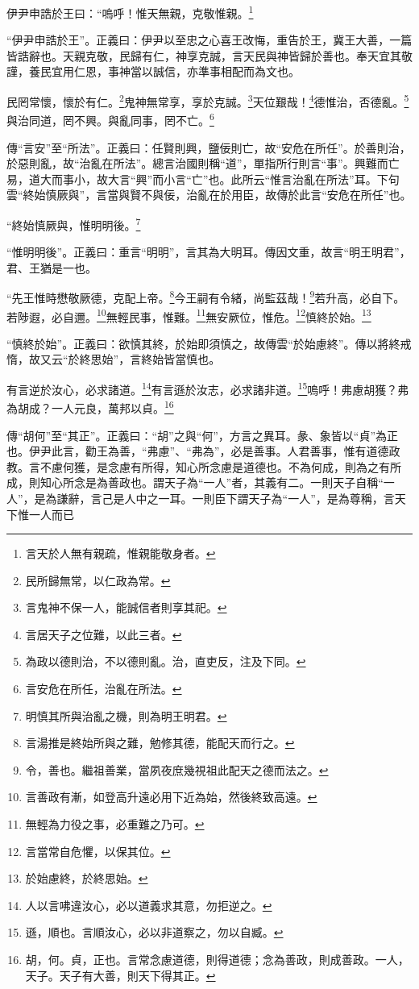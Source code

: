 伊尹申誥於王曰：“嗚呼！惟天無親，克敬惟親。\footnote{言天於人無有親疏，惟親能敬身者。}

{\noindent\shu{}\fzkt “伊尹申誥於王”。正義曰：伊尹以至忠之心喜王改悔，重告於王，冀王大善，一篇皆誥辭也。天親克敬，民歸有仁，神享克誠，言天民與神皆歸於善也。奉天宜其敬謹，養民宜用仁恩，事神當以誠信，亦準事相配而為文也。 \par}

民罔常懷，懷於有仁。\footnote{民所歸無常，以仁政為常。}鬼神無常享，享於克誠。\footnote{言鬼神不保一人，能誠信者則享其祀。}天位艱哉！\footnote{言居天子之位難，以此三者。}德惟治，否德亂。\footnote{為政以德則治，不以德則亂。治，直吏反，注及下同。}與治同道，罔不興。與亂同事，罔不亡。\footnote{言安危在所任，治亂在所法。}

{\noindent\zhuan{}\fzbyks 傳“言安”至“所法”。正義曰：任賢則興，鹽佞則亡，故“安危在所任”。於善則治，於惡則亂，故“治亂在所法”。總言治國則稱“道”，單指所行則言“事”。興難而亡易，道大而事小，故大言“興”而小言“亡”也。此所云“惟言治亂在所法”耳。下句雲“終始慎厥與”，言當與賢不與佞，治亂在於用臣，故傳於此言“安危在所任”也。 \par}

“終始慎厥與，惟明明後。\footnote{明慎其所與治亂之機，則為明王明君。}

{\noindent\shu{}\fzkt “惟明明後”。正義曰：重言“明明”，言其為大明耳。傳因文重，故言“明王明君”，君、王猶是一也。 \par}

“先王惟時懋敬厥德，克配上帝。\footnote{言湯推是終始所與之難，勉修其德，能配天而行之。}今王嗣有令緒，尚監茲哉！\footnote{令，善也。繼祖善業，當夙夜庶幾視祖此配天之德而法之。}若升高，必自下。若陟遐，必自邇。\footnote{言善政有漸，如登高升遠必用下近為始，然後終致高遠。}無輕民事，惟難。\footnote{無輕為力役之事，必重難之乃可。}無安厥位，惟危。\footnote{言當常自危懼，以保其位。}慎終於始。\footnote{於始慮終，於終思始。}

{\noindent\shu{}\fzkt “慎終於始”。正義曰：欲慎其終，於始即須慎之，故傳雲“於始慮終”。傳以將終戒惰，故又云“於終思始”，言終始皆當慎也。 \par}

有言逆於汝心，必求諸道。\footnote{人以言咈違汝心，必以道義求其意，勿拒逆之。}有言遜於汝志，必求諸非道。\footnote{遜，順也。言順汝心，必以非道察之，勿以自臧。}嗚呼！弗慮胡獲？弗為胡成？一人元良，萬邦以貞。\footnote{胡，何。貞，正也。言常念慮道德，則得道德；念為善政，則成善政。一人，天子。天子有大善，則天下得其正。}

{\noindent\zhuan{}\fzbyks 傳“胡何”至“其正”。正義曰：“胡”之與“何”，方言之異耳。彖、象皆以“貞”為正也。伊尹此言，勸王為善，“弗慮”、“弗為”，必是善事。人君善事，惟有道德政教。言不慮何獲，是念慮有所得，知心所念慮是道德也。不為何成，則為之有所成，則知心所念是為善政也。謂天子為“一人”者，其義有二。一則天子自稱“一人”，是為謙辭，言己是人中之一耳。一則臣下謂天子為“一人”，是為尊稱，言天下惟一人而已 \par}

